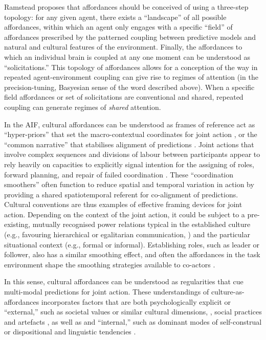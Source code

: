 \begin{CJK}{UTF8}{gbsn}
Ramstead proposes that affordances should be conceived of using a three-step topology: for any given agent, there exists a ``landscape'' of all possible affordances, within which an agent only engages with a specific ``field'' of affordances prescribed by the patterned coupling between predictive models and natural and cultural features of the environment.  Finally, the affordances to which an individual brain is coupled at any one moment can be understood as ``solicitations.''  This topology of affordances allows for a conception of the way in repeated agent-environment coupling can give rise to regimes of attention (in the precision-tuning, Basyesian sense of the word described above).  When a specific field affordances or set of solicitations are conventional and shared, repeated coupling can generate regimes of \textit{shared} attention.

In the AIF, cultural affordances can be understood as frames of reference act as ``hyper-priors'' that set the macro-contextual coordinates for joint action \citep{Clark2013}, or the ``common narrative'' that stabilises alignment of predictions \citep{Friston2015}.  Joint actions that involve complex sequences and divisions of labour between participants appear to rely heavily on capacities to explicitly signal intention for the assigning of roles, forward planning, and repair of failed coordination \citep{Frith2010}.  These ``coordination smoothers'' \citep{Vesper2017} often function to reduce spatial and temporal variation in action by providing a shared spatiotemporal referent for co-alignment of predictions.  Cultural conventions are thus examples of effective framing devices for joint action.  Depending on the context of the joint action, it could be subject to a pre-existing, mutually recognised power relations typical in the established culture (e.g., favouring hierarchical or egalitarian communication, \citep[see]{Cheon2011}) and the particular situational context (e.g., formal or informal).  Establishing roles, such as leader or follower, also has a similar smoothing effect, and often the affordances in the task environment shape the smoothing strategies available to co-actors \citep{Marsh2009}.

In this sense, cultural affordances can be understood as regularities that cue multi-modal predictions for joint action.  These understandings of culture-as-affordances incorporates factors that are both psychologically explicit or ``external,'' such as societal values or similar cultural dimensions, \citep{Hofstede1991,Schwartz1992}, social practices and artefacts  \citep{Nisbett2003a}, as well as and ``internal,'' such as dominant modes of self-construal or dispositional and linguistic tendencies \citep{Markus1991}.



\end{CJK}
